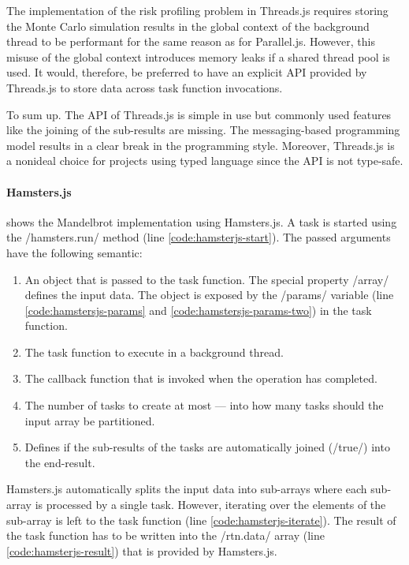 The implementation of the risk profiling problem in Threads.js requires storing the Monte Carlo simulation results in the global context of the background thread to be performant for the same reason as for Parallel.js. However, this misuse of the global context introduces memory leaks if a shared thread pool is used. It would, therefore, be preferred to have an explicit API provided by Threads.js to store data across task function invocations.

To sum up. The API of Threads.js is simple in use but commonly used features like the joining of the sub-results are missing. The messaging-based programming model results in a clear break in the programming style. Moreover, Threads.js is a nonideal choice for projects using typed language since the API is not type-safe.

\paragraph{Hamsters.js}
 shows the Mandelbrot implementation using Hamsters.js. A task is started using the \javascriptinline/hamsters.run/ method (line \ref{code:hamsterjs-start}). The passed arguments have the following semantic:

\begin{enumerate}
	\item An object that is passed to the task function. The special property \javascriptinline/array/ defines the input data. The object is exposed by the \javascriptinline/params/ variable (line \ref{code:hamstersjs-params} and \ref{code:hamstersjs-params-two}) in the task function.
	\item The task function to execute in a background thread.
	\item The callback function that is invoked when the operation has completed.
	\item The number of tasks to create at most --- into how many tasks should the input array be partitioned. 
	\item Defines if the sub-results of the tasks are automatically joined (\javascriptinline/true/) into the end-result.
\end{enumerate}

Hamsters.js automatically splits the input data into sub-arrays where each sub-array is processed by a single task. However, iterating over the elements of the sub-array is left to the task function (line \ref{code:hamsterjs-iterate}). The result of the task function has to be written into the \javascriptinline/rtn.data/ array (line \ref{code:hamsterjs-result}) that is provided by Hamsters.js. 


